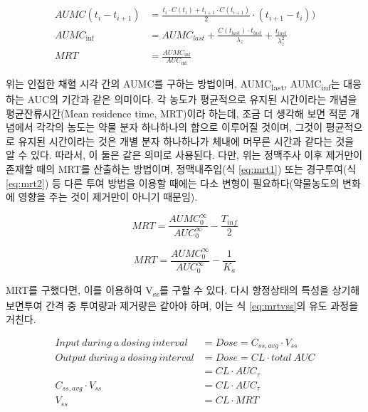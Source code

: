 \documentclass[
  11pt,
  krantz2, a4paper, twoside]{krantz}
\theoremstyle{definition}
\theoremstyle{definition}
\theoremstyle{definition}
\theoremstyle{definition}
\theoremstyle{remark}
\begin{document}
\begin{equation}
\begin{split}
  AUMC(t_i-t_{i+1}) &= \frac{t_i \cdot C(t_i) + t_{i+1} \cdot C(t_{i+1})}{2} \cdot (t_{i+1}-t_i)) \\
  AUMC_{\inf} &= AUMC_{last} + \frac{C(t_{last}) \cdot t_{last}}{\lambda_z} + \frac{t_{last}}{\lambda_z^2} \\
  MRT &= \frac{AUMC_{\inf}}{AUC_{\inf}}
\end{split}
\label{eq:mrteq}
\end{equation}

위는 인접한 채혈 시각 간의 AUMC를 구하는 방법이며, AUMC\textsubscript{last}, AUMC\textsubscript{inf}는 대응하는 AUC의 기간과 같은 의미이다.
각 농도가 평균적으로 유지된 시간이라는 개념을 평균잔류시간(Mean residence time, MRT)이라 하는데, 조금 더 생각해 보면 적분 개념에서 각각의 농도는 약물 분자 하나하나의 합으로 이루어질 것이며, 그것이 평균적으로 유지된 시간이라는 것은 개별 분자 하나하나가 체내에 머무른 시간과 같다는 것을 알 수 있다.
따라서, 이 둘은 같은 의미로 사용된다.
다만, 위는 정맥주사 이후 제거만이 존재할 때의 MRT를 산출하는 방법이며, 정맥내주입(식 \eqref{eq:mrt1}) 또는 경구투여(식 \eqref{eq:mrt2}) 등 다른 투여 방법을 이용할 때에는 다소 변형이 필요하다(약물농도의 변화에 영향을 주는 것이 제거만이 아니기 때문임).

\begin{equation}
MRT = \frac{AUMC_{0}^{\infty}}{AUC_{0}^{\infty}} - \frac{T_{inf}}{2}
\label{eq:mrt1}
\end{equation}

\begin{equation}
MRT = \frac{AUMC_{0}^{\infty}}{AUC_{0}^{\infty}} - \frac{1}{K_a}
\label{eq:mrt2}
\end{equation}

MRT를 구했다면, 이를 이용하여 V\textsubscript{ss}를 구할 수 있다. 다시 항정상태의 특성을 상기해 보면투여 간격 중 투여량과 제거량은 같아야 하며, 이는 식 \eqref{eq:mrtvss}의 유도 과정을 거친다.

\begin{equation}
\begin{split}
  Input\ during\ a\ dosing\ interval &= Dose = C_{ss,avg} \cdot V_{{ss}} \\
  Output\ during\ a\ dosing\ interval &= Dose = CL \cdot total\ AUC \\
  \ \  &= CL \cdot AUC_{\tau} \\
  C_{ss,avg} \cdot V_{{ss}} &= CL \cdot AUC_{\tau} \\
  V_{{ss}} &= CL \cdot MRT
\end{split}
\label{eq:mrtvss}
\end{equation}
\end{document}
